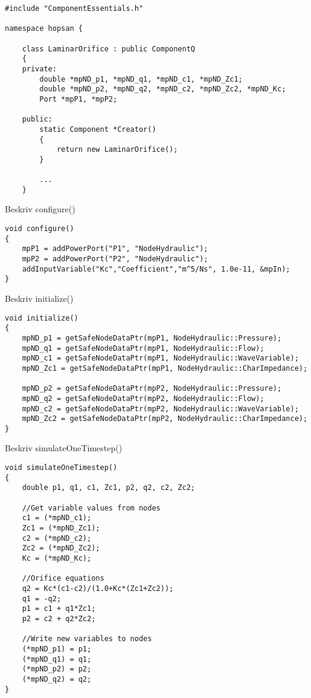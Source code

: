 \documentclass[a4paper,pdftex]{article}
\begin{document}
\begin{minipage}{\linewidth}
\begin{lstlisting}[basicstyle=\footnotesize\ttfamily]
#include "ComponentEssentials.h"

namespace hopsan {

    class LaminarOrifice : public ComponentQ
    {
    private:
        double *mpND_p1, *mpND_q1, *mpND_c1, *mpND_Zc1;
        double *mpND_p2, *mpND_q2, *mpND_c2, *mpND_Zc2, *mpND_Kc;
        Port *mpP1, *mpP2;

    public:
        static Component *Creator()
        {
            return new LaminarOrifice();
        }
        
        ...
    }
\end{lstlisting}
\end{minipage}

Beskriv configure()

\begin{minipage}{\linewidth}
\begin{lstlisting}[basicstyle=\footnotesize\ttfamily]
void configure()
{
    mpP1 = addPowerPort("P1", "NodeHydraulic");
    mpP2 = addPowerPort("P2", "NodeHydraulic");
    addInputVariable("Kc","Coefficient","m^5/Ns", 1.0e-11, &mpIn);
}
\end{lstlisting}
\end{minipage}

Beskriv initialize()

\begin{minipage}{\linewidth}
\begin{lstlisting}[basicstyle=\footnotesize\ttfamily]
void initialize()
{
    mpND_p1 = getSafeNodeDataPtr(mpP1, NodeHydraulic::Pressure);
    mpND_q1 = getSafeNodeDataPtr(mpP1, NodeHydraulic::Flow);
    mpND_c1 = getSafeNodeDataPtr(mpP1, NodeHydraulic::WaveVariable);
    mpND_Zc1 = getSafeNodeDataPtr(mpP1, NodeHydraulic::CharImpedance);

    mpND_p2 = getSafeNodeDataPtr(mpP2, NodeHydraulic::Pressure);
    mpND_q2 = getSafeNodeDataPtr(mpP2, NodeHydraulic::Flow);
    mpND_c2 = getSafeNodeDataPtr(mpP2, NodeHydraulic::WaveVariable);
    mpND_Zc2 = getSafeNodeDataPtr(mpP2, NodeHydraulic::CharImpedance);
}
\end{lstlisting}
\end{minipage}

Beskriv simulateOneTimestep()

\begin{minipage}{\linewidth}
\begin{lstlisting}[basicstyle=\footnotesize\ttfamily]
void simulateOneTimestep()
{
    double p1, q1, c1, Zc1, p2, q2, c2, Zc2;

    //Get variable values from nodes
    c1 = (*mpND_c1);
    Zc1 = (*mpND_Zc1);
    c2 = (*mpND_c2);
    Zc2 = (*mpND_Zc2);
    Kc = (*mpND_Kc);

    //Orifice equations
    q2 = Kc*(c1-c2)/(1.0+Kc*(Zc1+Zc2));
    q1 = -q2;
    p1 = c1 + q1*Zc1;
    p2 = c2 + q2*Zc2;

    //Write new variables to nodes
    (*mpND_p1) = p1;
    (*mpND_q1) = q1;
    (*mpND_p2) = p2;
    (*mpND_q2) = q2;
}
\end{lstlisting}
\end{minipage}
\end{document}
